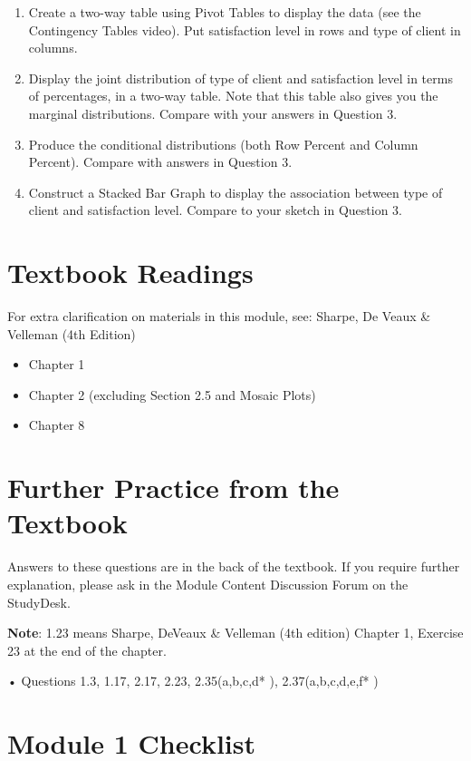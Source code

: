 \documentclass[
  11pt,
  oneside]{scrbook}
\begin{document}
\begin{enumerate}
\def\labelenumi{(\alph{enumi})}
\setcounter{enumi}{1}
\item
  Create a two-way table using Pivot Tables to display the data (see the Contingency Tables video). Put satisfaction level in rows and type of client in columns.
\item
  Display the joint distribution of type of client and satisfaction level in terms of percentages, in a two-way table. Note that this table also gives you the marginal distributions. Compare with your answers in Question 3.
\item
  Produce the conditional distributions (both Row Percent and Column Percent). Compare with answers in Question 3.
\item
  Construct a Stacked Bar Graph to display the association between type of client and satisfaction level. Compare to your sketch in Question 3.
\end{enumerate}

\section{Textbook Readings}\label{textbook-readings}

For extra clarification on materials in this module, see: Sharpe, De Veaux \& Velleman (4th Edition)

\begin{itemize}
\item
  Chapter 1
\item
  Chapter 2 (excluding Section 2.5 and Mosaic Plots)
\item
  Chapter 8
\end{itemize}

\section{Further Practice from the Textbook}\label{further-practice-from-the-textbook}

Answers to these questions are in the back of the textbook. If you require further explanation, please ask in the Module Content Discussion Forum on the StudyDesk.

\textbf{Note}: 1.23 means Sharpe, DeVeaux \& Velleman (4th edition) Chapter 1, Exercise 23 at the end of the chapter.

• Questions 1.3, 1.17, 2.17, 2.23, 2.35(a,b,c,d* ), 2.37(a,b,c,d,e,f* )

\section*{Module 1 Checklist}\label{module-1-checklist}
\end{document}
